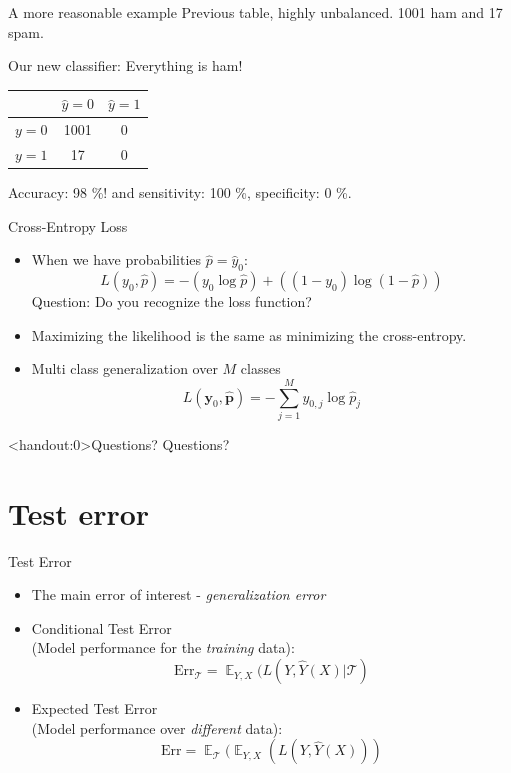 \documentclass[10pt,handout]{beamer}
\DeclareMathOperator{\E}{\mathbb{E}}
\begin{document}
\begin{frame}{A more reasonable example}
Previous table, highly unbalanced. 1001 ham and 17 spam.

Our new classifier: Everything is ham!\pause

\begin{center}
\begin{tabular}{ l | c | c }
  & $\hat{y}=0$ & $\hat{y}=1$\\
  \hline
  $y=0$ & 1001 & 0 \\
  $y=1$ & 17 & 0 \\
  \hline
\end{tabular}
\end{center}
\pause

Accuracy: 98 \%! and sensitivity: 100 \%, specificity: 0 \%.\\[3mm]

\end{frame}


\begin{frame}{Cross-Entropy Loss}

\begin{itemize}
\item When we have probabilities $\hat{p}=\hat{y}_0$:
\[
L(y_0, \hat{p}) = - (y_0 \log{\hat{p}}) + ((1 - y_0) \log{(1- \hat{p})})
\]
Question: Do you recognize the loss function?
\pause
\item Maximizing the likelihood is the same as minimizing the cross-entropy. \pause
\item Multi class generalization over $M$ classes
\[
L(\mathbf{y}_0, \hat{\mathbf{p}}) = - \sum^M_{j=1} y_{0,j} \log{\hat{p}_j}
\]
\end{itemize}

\end{frame}


\begin{frame}<handout:0>{Questions?}
Questions?
\end{frame}



\section{Test error}
\frame{\sectionpage}

\begin{frame}{Test Error}

\begin{itemize}
\item The main error of interest - \emph{generalization error}
\item Conditional Test Error \\(Model performance for the \emph{training} data):
\[
\text{Err}_\mathcal{T} = \E_{Y,X}(L(Y,\hat{Y}(X) | \mathcal{T})
\]
\item Expected Test Error \\(Model performance over \emph{different} data):
\[
\text{Err} = \E_\mathcal{T}(\E_{Y,X}(L(Y,\hat{Y}(X)))
\]

\end{itemize}

\end{frame}
\end{document}

